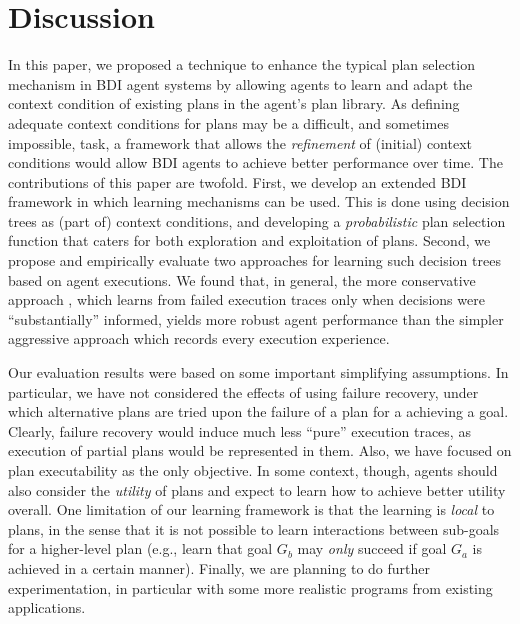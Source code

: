 \section{Discussion}\label{sec:discussion}

In this paper, we proposed a technique to enhance the typical plan selection mechanism
in BDI agent systems by allowing agents to learn and adapt the context condition of existing plans
in the agent's plan library.
%
As defining adequate context conditions for plans may be a difficult, and
sometimes 
impossible, task, a framework that allows the \emph{refinement} of (initial) context
conditions would allow BDI agents to achieve better performance over time.
%
The contributions of this paper are twofold. First, we develop an extended BDI framework in which
learning mechanisms can be used. This is done using decision trees as (part of) context
conditions, and developing a \textit{probabilistic} plan selection function that caters for both
exploration and exploitation of plans. Second, we propose and empirically evaluate two approaches
for learning such decision trees based on agent executions. We found that, in general, the more
conservative approach \BUL, which learns from failed execution traces only when decisions were
``substantially'' informed, yields more robust agent performance than the simpler aggressive
approach \CL which records every execution experience.


Our evaluation results were based on some important simplifying assumptions. In particular,
we have not considered the effects of using failure recovery, under which alternative plans are
tried upon the failure of a plan for a achieving a goal. Clearly, failure recovery would induce much
less ``pure'' execution traces, as execution of partial plans would be represented in them. Also,
we have focused on plan executability as the only objective. In some context, though, agents 
should also consider the \textit{utility} of plans and expect to learn how to achieve better utility
overall.
%
One limitation of our learning framework is that the learning is \emph{local} to plans, in the
sense that it is not possible to learn interactions between sub-goals for a higher-level plan (e.g.,
learn that goal $G_b$ may \textit{only} succeed if goal $G_a$ is achieved in a certain manner).
%
Finally, we are planning to do further experimentation, in particular with some more realistic
programs from existing applications. 


